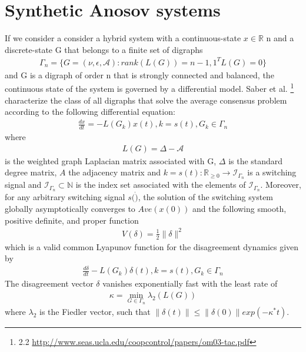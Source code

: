 \documentclass{article}
\begin{document}
\section{Synthetic Anosov systems}
If we consider a consider a hybrid system with a continuous-state $x \in \mathbb{R}$ n and a discrete-state G that belongs to a finite set of digraphs 
\begin{equation} \label{eq1}
\begin{split}
\Gamma_n = \{G= (\nu, \epsilon, \mathcal{A}): rank(L(G)) = n-1, 1^{T}L(G)=0 \}
\end{split}
\end{equation}
and G is a digraph of order n that is strongly connected and balanced, the continuous state of the system is governed by a differential model. Saber et al. \footnote{2.2 \url{http://www.seas.ucla.edu/coopcontrol/papers/om03-tac.pdf}} characterize the class of all digraphs that solve the average consensus problem according to the following differential equation:
\begin{equation} \label{eq1}
\begin{split}
\frac{dx}{dt} = -L(G_k)x(t), k = s(t), G_k \in \Gamma_n
\end{split}
\end{equation}
where
\begin{equation} \label{eq1}
\begin{split}
L(G) = \Delta - \mathcal{A}
\end{split}
\end{equation}
is the weighted graph Laplacian matrix associated with G, $\Delta$ is the standard degree matrix, $A$ the adjacency matrix and $k = s(t): \mathbb{R}_{\geq 0} \rightarrow \mathcal{I}_{\Gamma_n}$ is a switching signal and $\mathcal{I}_{\Gamma_n} \subset \mathbb{N}$ is the index set associated with the elements of $\mathcal{I}_{\Gamma_n}$. Moreover, for any arbitrary switching signal $s(\dot)$, the solution of the switching system globally asymptotically converges to $Ave(x(0))$ and the following smooth, positive definite, and proper function
\begin{equation} \label{eq1}
\begin{split}
V(\delta) = \frac{1}{2}  \lVert \delta \rVert^2
\end{split}
\end{equation}
which is a valid common Lyapunov function for the disagreement dynamics given by
\begin{equation} \label{eq1}
\begin{split}
\frac{d\delta}{dt} - L(G_k)\delta(t), k = s(t), G_k \in \Gamma_n
\end{split}
\end{equation}
The disagreement vector $\delta$ vanishes exponentially fast with the least rate of 
\begin{equation} \label{eq1}
\begin{split}
\kappa = \min_{G \in \Gamma_n}\lambda_2(L(G))
\end{split}
\end{equation}
where $\lambda_2$ is the Fiedler vector, such that $\lVert \delta(t) \rVert \leq \lVert \delta(0) \rVert exp(-\kappa^* t)$.
\end{document}
